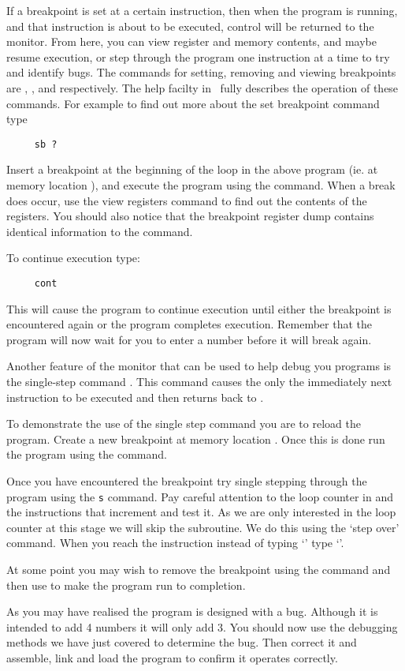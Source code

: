 If a breakpoint is set at a certain instruction, then when the program
is running, and that instruction is about to be executed, control will
be returned to the monitor. From here, you can view register and
memory contents, and maybe resume execution, or step through the
program one instruction at a time to try and identify bugs.  The
commands for setting, removing and viewing breakpoints are ,
, and  respectively. The help facilty in \WRAMPmon\
fully describes the operation of these commands. For example to find
out more about the set breakpoint command type
\begin{verbatim}
     sb ?
\end{verbatim}

Insert a breakpoint at the beginning of the loop in the above program 
(ie. at memory location \src{0x00004}), and
execute the program using the  command.
When a break does occur, use the view registers command to find out the 
contents of the registers. You should also notice that the breakpoint 
register dump contains identical information
to the  command.

To continue execution type:
\begin{verbatim}
     cont
\end{verbatim}
This will cause the program to continue execution until either the
breakpoint is encountered again or the program completes
execution. Remember that the program will now wait for you to enter a
number before it will break again.

Another feature of the monitor that can be used to help debug you programs 
is the single-step command \src{s}.
This command causes the only the immediately next instruction 
to be executed and then returns back to
\WRAMPmon.

To demonstrate the use of the single step command you are to reload
the program.  Create a new breakpoint at memory location
. Once this is done run the program using the 
command.

Once you have encountered the breakpoint try single stepping through
the program using the \verb|s| command. Pay careful attention to the
loop counter in \reg{5} and the instructions that increment and test
it. As we are only interested in the loop counter at this stage we
will skip the \src{readnum} subroutine.  We do this using the `step
over'  command.  When you reach the instruction \src{jal
readnum} instead of typing `\src{s}' type `\src{so}'.

At some point you may wish to remove the breakpoint using the
 command and then use  to make the program run to
completion.

As you may have realised the program is designed with a bug.  Although
it is intended to add 4 numbers it will only add 3.  You should now use
the debugging methods we have just covered to determine the
bug.  Then correct it and assemble, link and load the program to confirm
it operates correctly.